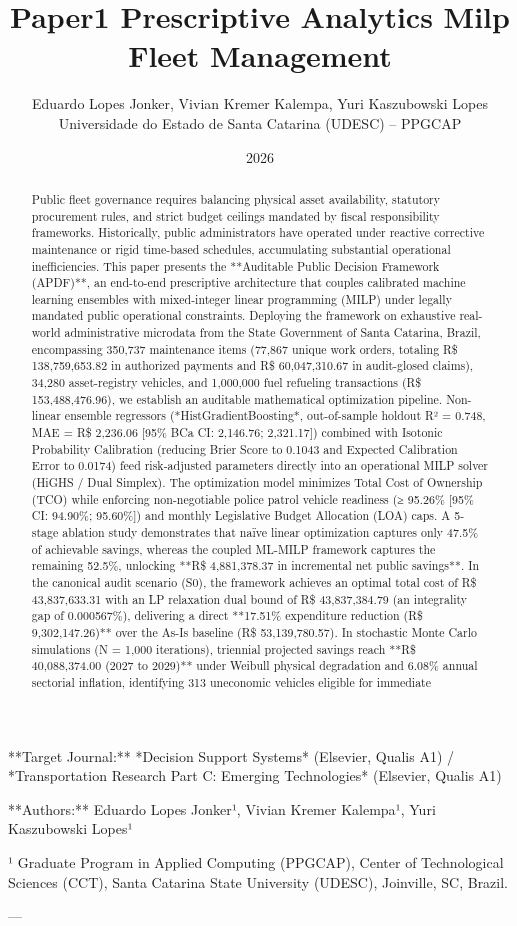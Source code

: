 \documentclass[10pt,a4paper,journal]{article}
\title{Paper1 Prescriptive Analytics Milp Fleet Management}
\author{Eduardo Lopes Jonker, Vivian Kremer Kalempa, Yuri Kaszubowski Lopes\\ \small Universidade do Estado de Santa Catarina (UDESC) -- PPGCAP}
\date{2026}
\begin{document}
\maketitle

**Target Journal:** *Decision Support Systems* (Elsevier, Qualis A1) / *Transportation Research Part C: Emerging Technologies* (Elsevier, Qualis A1)

**Authors:** Eduardo Lopes Jonker¹, Vivian Kremer Kalempa¹, Yuri Kaszubowski Lopes¹

¹ Graduate Program in Applied Computing (PPGCAP), Center of Technological Sciences (CCT), Santa Catarina State University (UDESC), Joinville, SC, Brazil.

---

\begin{abstract}
Public fleet governance requires balancing physical asset availability, statutory procurement rules, and strict budget ceilings mandated by fiscal responsibility frameworks. Historically, public administrators have operated under reactive corrective maintenance or rigid time-based schedules, accumulating substantial operational inefficiencies. This paper presents the **Auditable Public Decision Framework (APDF)**, an end-to-end prescriptive architecture that couples calibrated machine learning ensembles with mixed-integer linear programming (MILP) under legally mandated public operational constraints. Deploying the framework on exhaustive real-world administrative microdata from the State Government of Santa Catarina, Brazil, encompassing 350,737 maintenance items (77,867 unique work orders, totaling R\$ 138,759,653.82 in authorized payments and R\$ 60,047,310.67 in audit-glosed claims), 34,280 asset-registry vehicles, and 1,000,000 fuel refueling transactions (R\$ 153,488,476.96), we establish an auditable mathematical optimization pipeline. Non-linear ensemble regressors (*HistGradientBoosting*, out-of-sample holdout R² = 0.748, MAE = R\$ 2,236.06 [95\% BCa CI: 2,146.76; 2,321.17]) combined with Isotonic Probability Calibration (reducing Brier Score to 0.1043 and Expected Calibration Error to 0.0174) feed risk-adjusted parameters directly into an operational MILP solver (HiGHS / Dual Simplex). The optimization model minimizes Total Cost of Ownership (TCO) while enforcing non-negotiable police patrol vehicle readiness (≥ 95.26\% [95\% CI: 94.90\%; 95.60\%]) and monthly Legislative Budget Allocation (LOA) caps. A 5-stage ablation study demonstrates that naïve linear optimization captures only 47.5\% of achievable savings, whereas the coupled ML-MILP framework captures the remaining 52.5\%, unlocking **R\$ 4,881,378.37 in incremental net public savings**. In the canonical audit scenario (S0), the framework achieves an optimal total cost of R\$ 43,837,633.31 with an LP relaxation dual bound of R\$ 43,837,384.79 (an integrality gap of 0.000567\%), delivering a direct **17.51\% expenditure reduction (R\$ 9,302,147.26)** over the As-Is baseline (R\$ 53,139,780.57). In stochastic Monte Carlo simulations (N = 1,000 iterations), triennial projected savings reach **R\$ 40,088,374.00 (2027 to 2029)** under Weibull physical degradation and 6.08\% annual sectorial inflation, identifying 313 uneconomic vehicles eligible for immediate 
\end{abstract}
\end{document}
